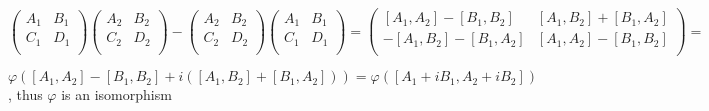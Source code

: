 \documentclass[main]{subfiles}
\newcommand{\<}[1]{\langle #1 \rangle}
\begin{document}
$
\left( {\begin{array}{cc}
A_1 & B_1 \\
C_1 & D_1 \\
\end{array} } \right)\left( {\begin{array}{cc}
A_2 & B_2 \\
C_2 & D_2 \\
\end{array} } \right)-\left( {\begin{array}{cc}
A_2 & B_2 \\
C_2 & D_2 \\
\end{array} } \right)\left( {\begin{array}{cc}
A_1 & B_1 \\
C_1 & D_1 \\
\end{array} } \right)
=\left( {\begin{array}{cc}
[A_1,A_2]-[B_1,B_2] & [A_1,B_2]+[B_1,A_2] \\
-[A_1,B_2]-[B_1,A_2] & [A_1,A_2]-[B_1,B_2] \\
\end{array} } \right)=$\par
$\varphi\left([A_1,A_2]-[B_1,B_2]+i([A_1,B_2]+[B_1,A_2])\right)=\varphi\left([A_1+iB_1,A_2+iB_2]\right)$, thus $\varphi$ is an isomorphism \par

\begin{exercise}
\begin{enumerate}[label=(\alph*),leftmargin=*]

\end{enumerate}
\end{exercise}
\end{document}
